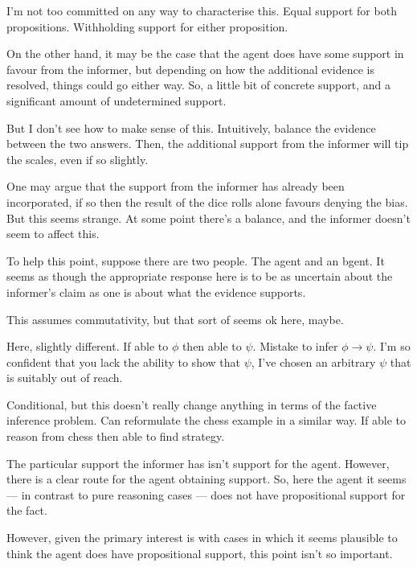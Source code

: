 \documentclass[10pt]{article}
\begin{document}
\begin{note}
{    I'm not too committed on any way to characterise this.
    Equal support for both propositions.
    Withholding support for either proposition.

    On the other hand, it may be the case that the agent does have some support in favour from the informer, but depending on how the additional evidence is resolved, things could go either way.
    So, a little bit of concrete support, and a significant amount of undetermined support.

    But I don't see how to make sense of this.
    Intuitively, balance the evidence between the two answers.
    Then, the additional support from the informer will tip the scales, even if so slightly.

    One may argue that the support from the informer has already been incorporated, if so then the result of the dice rolls alone favours denying the bias.
    But this seems strange.
    At some point there's a balance, and the informer doesn't seem to affect this.

    To help this point, suppose there are two people.
    The agent and an bgent.
    It seems as though the appropriate response here is to be as uncertain about the informer's claim as one is about what the evidence supports.

    This assumes commutativity, but that sort of seems ok here, maybe.
  }
\end{note}

\begin{note}
  Here, slightly different.
  If able to \(\phi\) then able to \(\psi\).
  Mistake to infer \(\phi \rightarrow \psi\).
  I'm so confident that you lack the ability to show that \(\psi\), I've chosen an arbitrary \(\psi\) that is suitably out of reach.

  Conditional, but this doesn't really change anything in terms of the factive inference problem.
  Can reformulate the chess example in a similar way.
  If able to reason from chess then able to find strategy.
\end{note}

The particular support the informer has isn't support for the agent.
However, there is a clear route for the agent obtaining support.
So, here the agent it seems --- in contrast to pure reasoning cases --- does not have propositional support for the fact.

However, given the primary interest is with cases in which it seems plausible to think the agent does have propositional support, this point isn't so important.
\end{document}
